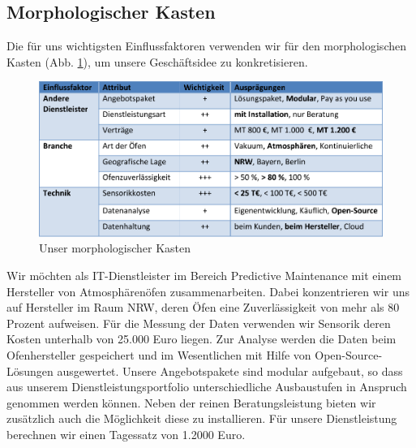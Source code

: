 \newpage
\subsection{Morphologischer Kasten}
Die für uns wichtigsten Einflussfaktoren verwenden wir für den morphologischen Kasten (Abb. \ref{fig:MorphologischerKasten}), um unsere Geschäftsidee zu konkretisieren.

\begin{figure}[H]
\centering
\includegraphics[width=0.9\linewidth]{Bilder/MorphologischerKasten}
\caption{Unser morphologischer Kasten}
\label{fig:MorphologischerKasten}
\end{figure}

Wir möchten als IT-Dienstleister im Bereich Predictive Maintenance mit einem Hersteller von Atmosphärenöfen zusammenarbeiten. Dabei konzentrieren wir uns auf Hersteller im Raum NRW, deren Öfen eine Zuverlässigkeit von mehr als 80 Prozent aufweisen. Für die Messung der Daten verwenden wir Sensorik deren Kosten unterhalb von 25.000 Euro liegen. Zur Analyse werden die Daten beim Ofenhersteller gespeichert und im Wesentlichen mit Hilfe von Open-Source-Lösungen ausgewertet. Unsere Angebotspakete sind modular aufgebaut, so dass aus unserem Dienstleistungsportfolio unterschiedliche Ausbaustufen in Anspruch genommen werden können. Neben der reinen Beratungsleistung bieten wir zusätzlich auch die Möglichkeit diese zu installieren. Für unsere Dienstleistung berechnen wir einen Tagessatz von 1.2000 Euro.
